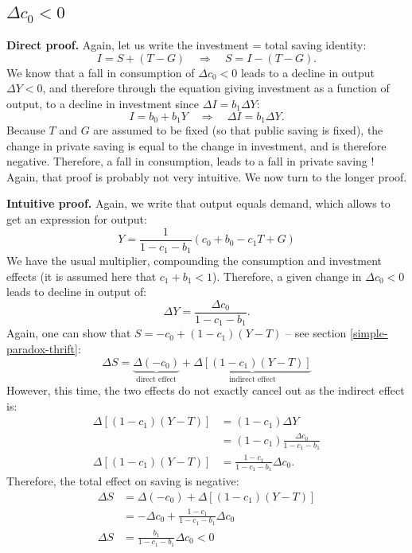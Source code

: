 \documentclass[]{book}
\begin{document}
\subsection{\texorpdfstring{\(\Delta c_{0}<0\)}{\textbackslash{}Delta c\_\{0\}\textless{}0}}\label{delta-c_00-1}

\textbf{Direct proof.} Again, let us write the investment = total saving
identity:
\[I=S+\left(T-G\right)\quad\Rightarrow\quad S=I-\left(T-G\right).\] We
know that a fall in consumption of \(\Delta c_{0}<0\) leads to a decline
in output \(\Delta Y<0\), and therefore through the equation giving
investment as a function of output, to a decline in investment since
\(\Delta I=b_{1}\Delta Y\):
\[I=b_{0}+b_{1}Y\quad\Rightarrow\quad\Delta I=b_{1}\Delta Y.\] Because
\(T\) and \(G\) are assumed to be fixed (so that public saving is
fixed), the change in private saving is equal to the change in
investment, and is therefore negative. Therefore, a fall in consumption,
leads to a fall in private saving ! Again, that proof is probably not
very intuitive. We now turn to the longer proof.

\textbf{Intuitive proof.} Again, we write that output equals demand,
which allows to get an expression for output:
\[Y=\frac{1}{1-c_{1}-b_{1}}\left(c_{0}+b_{0}-c_{1}T+G\right)\] We have
the usual multiplier, compounding the consumption and investment effects
(it is assumed here that \(c_{1}+b_{1}<1\)). Therefore, a given change
in \(\Delta c_{0}<0\) leads to decline in output of:
\[\Delta Y=\frac{\Delta c_{0}}{1-c_{1}-b_{1}}.\] Again, one can show
that \(S=-c_{0}+\left(1-c_{1}\right)\left(Y-T\right)\) -- see section
\ref{simple-paradox-thrift}:
\[\Delta S=\underbrace{\Delta(-c_{0})}_{\text{direct effect}}+\underbrace{\Delta\left[\left(1-c_{1}\right)\left(Y-T\right)\right]}_{\text{indirect effect}}\]
However, this time, the two effects do not exactly cancel out as the
indirect effect is: \[
\begin{aligned}
\Delta\left[\left(1-c_{1}\right)\left(Y-T\right)\right] &=(1-c_{1})\Delta Y\\
    &=(1-c_{1})\frac{\Delta c_{0}}{1-c_{1}-b_{1}}\\
\Delta\left[\left(1-c_{1}\right)\left(Y-T\right)\right] &=\frac{1-c_{1}}{1-c_{1}-b_{1}}\Delta c_{0}.
\end{aligned}
\] Therefore, the total effect on saving is negative: \[
\begin{aligned}
\Delta S    &=\Delta(-c_{0})+\Delta\left[\left(1-c_{1}\right)\left(Y-T\right)\right]\\
    &=-\Delta c_{0}+\frac{1-c_{1}}{1-c_{1}-b_{1}}\Delta c_{0}\\
\Delta S    &=\frac{b_{1}}{1-c_{1}-b_{1}}\Delta c_{0} <0
\end{aligned}
\]
\end{document}
